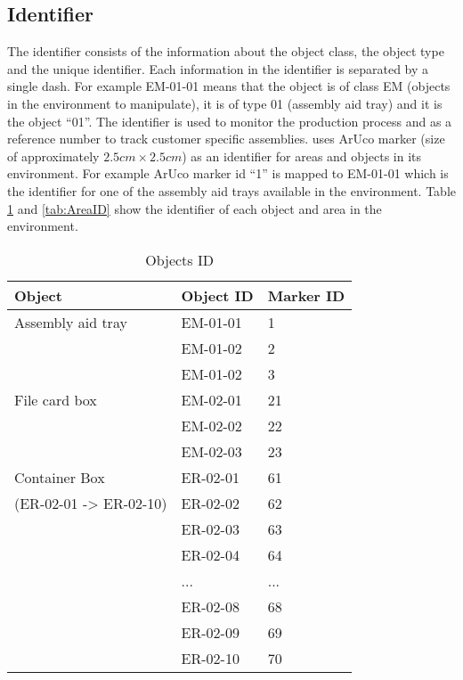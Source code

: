 
\subsection{Identifier}
\label{ssec:Identifier}

The identifier consists of the information about the object class, the object type and the unique identifier.
Each information in the identifier is separated by a single dash.
For example EM-01-01 means that the object is of class EM (objects in the environment to manipulate), it is of type 01
(assembly aid tray) and it is the object ``01''.
The identifier is used to monitor the production process and as a reference number to track customer specific assemblies.
\erlir uses ArUco marker (size of approximately $2.5cm\times2.5cm$) as an identifier for areas and objects in its environment. 
For example ArUco marker id ``1'' is mapped to EM-01-01 which is the identifier for one of the assembly aid trays available in the environment. 
Table \ref{tab:ObjectID} and \ref{tab:AreaID} show the identifier of each object and area in the \erlir environment.

\begin{longtable}{|l|l|l|}
\caption{Objects ID}
\label{tab:ObjectID}
\\ \hline
\textbf{Object} & \textbf{Object ID} & \textbf{Marker ID}\\ 
  \hline 
Assembly aid tray & EM-01-01 & 1 \\ \cline{2-3}
& EM-01-02 & 2 \\ \cline{2-3}
&  EM-01-02 & 3 \\ \hline 
File card box & EM-02-01 & 21 \\ \cline{2-3}
 & EM-02-02 & 22 \\ \cline{2-3}
& EM-02-03 & 23 \\ \hline
Container Box& ER-02-01 & 61 \\ \cline{2-3}
(ER-02-01 -> ER-02-10) & ER-02-02 & 62 \\ \cline{2-3}
& ER-02-03 & 63 \\ \cline{2-3}
& ER-02-04 & 64 \\ \cline{2-3}
& ... & ...  \\ \cline{2-3}
& ER-02-08 & 68 \\ \cline{2-3}
& ER-02-09 & 69 \\ \cline{2-3}
& ER-02-10 & 70 \\ \hline 
\end{longtable} 		

